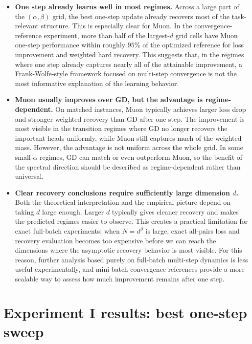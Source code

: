 \documentclass[11pt]{article}
\begin{document}
\begin{itemize}[leftmargin=*]
    \item \textbf{One step already learns well in most regimes.}
    Across a large part of the $(\alpha,\beta)$ grid, the best one-step update
    already recovers most of the task-relevant structure.  This is especially
    clear for Muon.  In the convergence-reference experiment, more
    than half of the largest-$d$ grid cells have Muon one-step
    performance within roughly $95\%$ of the optimized reference for loss
    improvement and weighted hard recovery.  This suggests that, in the
    regimes where one step already captures nearly all of the attainable
    improvement, a Frank-Wolfe-style framework focused on multi-step
    convergence is not the most informative explanation of the learning
    behavior.

    \item \textbf{Muon usually improves over GD, but the advantage is
    regime-dependent.}
    On matched instances, Muon typically achieves larger loss drop
    and stronger weighted recovery than GD after one step.  The improvement is
    most visible in the transition regimes where GD no longer recovers the
    important heads uniformly, while Muon still captures much of the
    weighted mass.  However, the advantage is not uniform across the whole
    grid.  In some small-$\alpha$ regimes, GD can match or even outperform
    Muon, so the benefit of the spectral direction should be described as regime-dependent rather than universal.

    \item \textbf{Clear recovery conclusions require sufficiently large
    dimension $d$.}
    Both the theoretical interpretation and the empirical picture depend on
    taking $d$ large enough.  Larger $d$ typically gives cleaner recovery and
    makes the predicted regimes easier to observe.  This creates a practical
    limitation for exact full-batch experiments: when $N=d^\beta$ is large,
    exact all-pairs loss and recovery evaluation becomes too expensive before
    we can reach the dimensions where the asymptotic recovery behavior is most
    visible.  For this reason, further analysis based purely on full-batch
    multi-step dynamics is less useful experimentally, and mini-batch
    convergence references provide a more scalable way to assess how much
    improvement remains after one step.
\end{itemize}

\section{Experiment I results: best one-step sweep}
\end{document}
